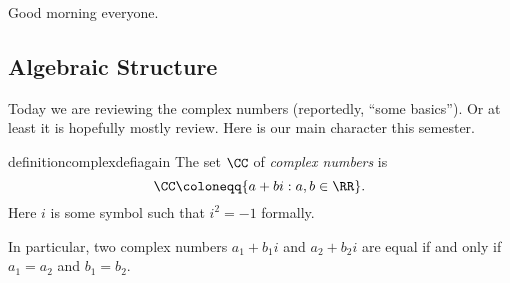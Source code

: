 \documentclass[../notes.tex]{subfiles}
\begin{document}

Good morning everyone.

\subsection{Algebraic Structure}
Today we are reviewing the complex numbers (reportedly, ``some basics''). Or at least it is hopefully mostly review. Here is our main character this semester.
\begin{restatable}{definition}{complexdefiagain}
	The set $\CC$ of \textit{complex numbers} is
	\[\CC\coloneqq \{a+bi:a,b\in\RR\}.\]
	Here $i$ is some symbol such that $i^2=-1$ formally.
\end{restatable}
\noindent In particular, two complex numbers $a_1+b_1i$ and $a_2+b_2i$ are equal if and only if $a_1=a_2$ and $b_1=b_2$.
\end{document}
